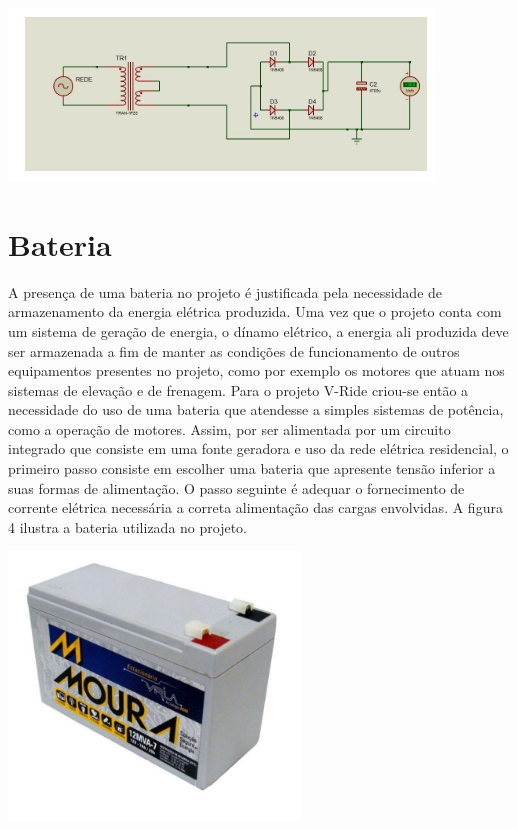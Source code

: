                          
 \begin{center}
    	\includegraphics[scale=0.7]{figuras/esquema}
        \label{esquema}
    \end{center}
    \section{Bateria}  
A presença de uma bateria no projeto é justificada pela necessidade de armazenamento da energia elétrica produzida. Uma vez que o projeto conta com um sistema de geração de energia, o dínamo elétrico, a energia ali produzida deve ser armazenada a fim de manter as condições de funcionamento de outros equipamentos presentes no projeto, como por exemplo os motores que atuam nos sistemas de elevação e de frenagem. 
 Para o projeto V-Ride criou-se então a necessidade do uso de uma bateria que atendesse a simples sistemas de potência, como a operação de motores. Assim, por ser alimentada por um circuito integrado que consiste em uma fonte geradora e uso da rede elétrica residencial, o primeiro passo consiste em escolher uma bateria que apresente tensão inferior a suas formas de alimentação. O passo seguinte é adequar o fornecimento de corrente elétrica necessária a correta alimentação das cargas envolvidas. A figura 4 ilustra a bateria utilizada no projeto.
                                        
                         
 \begin{center}
    	\includegraphics[scale=0.7]{figuras/projeto}
        \label{projeto}
    \end{center}
      
